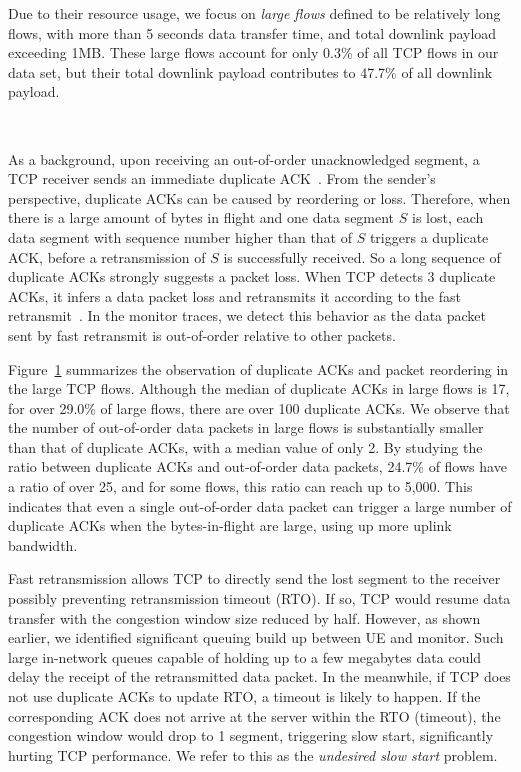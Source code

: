 \label{sec:tcp.tcp}

Due to their resource usage, we focus on \emph{large flows} defined to be relatively long flows, with more than 5 seconds data transfer time, and total downlink payload exceeding 1MB. These large flows account for only 0.3\% of all TCP flows in our data set, but their total downlink payload contributes to  47.7\% of all downlink payload.

\begin{figure}[h]
\centering
{}\\
\label{fig:dup.ack}
\end{figure}

As a background, upon receiving an out-of-order unacknowledged segment, a TCP receiver sends an immediate duplicate ACK~\cite{rfc5681}. From the sender's perspective, duplicate ACKs can be caused by reordering or loss. Therefore, when there is a large amount of bytes in flight and one data segment $S$ is lost, each data segment with sequence number higher than that of $S$ triggers a duplicate ACK, before a retransmission of $S$ is successfully received. So a long sequence of duplicate ACKs strongly suggests a packet loss. When TCP detects 3 duplicate ACKs, it infers a data packet loss and retransmits it according to the fast retransmit~\cite{rfc5681}. In the monitor traces, we detect this behavior as the data packet sent by fast retransmit is out-of-order relative to other packets.

Figure~\ref{fig:dup.ack} summarizes the observation of duplicate ACKs and packet reordering in the large TCP flows. Although the median of duplicate ACKs in large flows is 17, for over 29.0\% of large flows, there are over 100 duplicate ACKs. We observe that the number of out-of-order data packets in large flows is substantially smaller than that of duplicate ACKs, with a median value of only 2. By studying the ratio between duplicate ACKs and out-of-order data packets, 24.7\% of flows have a ratio of over 25, and for some flows, this ratio can reach up to 5,000. This indicates that even a single out-of-order data packet can trigger a large number of duplicate ACKs when the bytes-in-flight are large, using up more uplink bandwidth.

Fast retransmission allows TCP to directly send the lost segment to the receiver possibly preventing retransmission timeout (RTO). If so, TCP would resume data transfer with the congestion window size reduced by half. However, as shown earlier, we identified significant queuing build up between UE and monitor. Such large in-network queues capable of holding up to a few megabytes data could delay the receipt of the retransmitted data packet. In the meanwhile, if TCP does not use duplicate ACKs to update RTO, a timeout is likely to happen. If the corresponding ACK does not arrive at the server within the RTO (timeout), the congestion window would drop to 1 segment, triggering slow start, significantly hurting TCP performance. We refer to this as the \emph{undesired slow start} problem.

